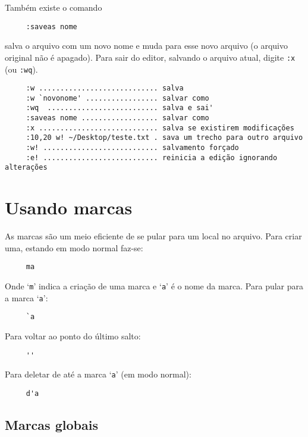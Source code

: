 Também existe o comando

\begin{verbatim}
     :saveas nome
\end{verbatim}

salva o arquivo com um novo nome e muda para esse novo arquivo (o arquivo
original não é apagado).  Para sair do editor, salvando o arquivo atual, digite
{\tt :x} (ou {\tt :wq}).

\begin{verbatim}
     :w ............................ salva
     :w `novonome' ................. salvar como
     :wq  .......................... salva e sai'
     :saveas nome .................. salvar como
     :x ............................ salva se existirem modificações
     :10,20 w! ~/Desktop/teste.txt . sava um trecho para outro arquivo
     :w! ........................... salvamento forçado
     :e! ........................... reinicia a edição ignorando alterações
\end{verbatim}

\section{Usando marcas}
\label{sec:Usando marcas}

As marcas são um meio eficiente de se pular para um local no arquivo. Para
criar uma,  estando em modo normal faz-se:

\begin{verbatim}
     ma
\end{verbatim}

Onde `{\tt m}' indica a criação de uma marca e `{\tt a}' é o nome da marca.
Para pular para a marca `{\tt a}':

\begin{verbatim}
     `a
\end{verbatim}

Para voltar ao ponto do último salto:

\begin{verbatim}
     ''
\end{verbatim}

Para deletar de até a marca `{\tt a}' (em modo normal):

\begin{verbatim}
     d'a
\end{verbatim}

\subsection{Marcas globais}

